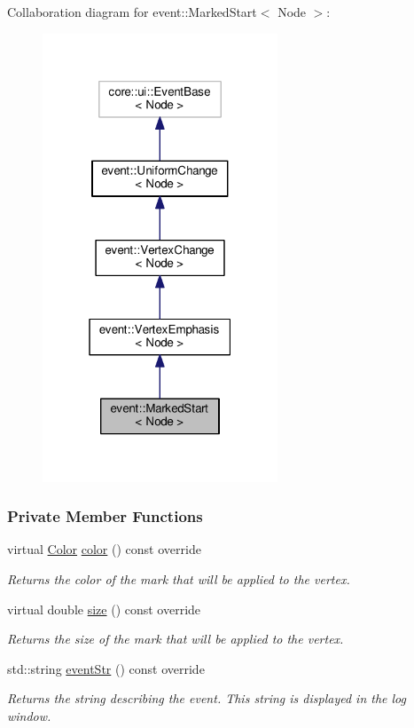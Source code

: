 Collaboration diagram for event\+:\+:Marked\+Start$<$ Node $>$\+:\nopagebreak
\begin{figure}[H]
\begin{center}
\leavevmode
\includegraphics[width=199pt]{structevent_1_1MarkedStart__coll__graph}
\end{center}
\end{figure}
\subsubsection*{Private Member Functions}
\begin{DoxyCompactItemize}
\item 
virtual \hyperlink{colors_8h_ab87bacfdad76e61b9412d7124be44c1c}{Color} \hyperlink{structevent_1_1MarkedStart_a4108fb94976d0397186bd214d7729268}{color} () const override
\begin{DoxyCompactList}\small\item\em Returns the color of the mark that will be applied to the vertex. \end{DoxyCompactList}\item 
virtual double \hyperlink{structevent_1_1MarkedStart_afb81cf71f52527b0faf77132d217a036}{size} () const override
\begin{DoxyCompactList}\small\item\em Returns the size of the mark that will be applied to the vertex. \end{DoxyCompactList}\item 
std\+::string \hyperlink{structevent_1_1MarkedStart_a5a82c4ac454df08245a3b7e0c66fbab7}{event\+Str} () const override
\begin{DoxyCompactList}\small\item\em Returns the string describing the event. This string is displayed in the log window. \end{DoxyCompactList}\end{DoxyCompactItemize}
